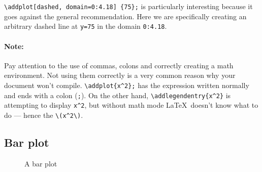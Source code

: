 \verb|\addplot[dashed, domain=0:4.18] {75};| is particularly interesting because it goes against the general recommendation.
Here we are specifically creating an arbitrary dashed line at \verb|y=75| in the domain \verb|0:4.18|.

\paragraph{Note: }
Pay attention to the use of commas, colons and correctly creating a math environment.
Not using them correctly is a very common reason why your document won't compile.
\verb|\addplot{x^2};| has the expression written normally and ends with a colon (\verb|;|).
On the other hand, \verb|\addlegendentry{x^2}| is attempting to display \verb|x^2|, but without math mode \LaTeX\ doesn't know what to do --- hence the \verb|\(x^2\)|.

\subsection{Bar plot}

\begin{figure}[h]\centering
{}
\caption{A bar plot}
\end{figure}

